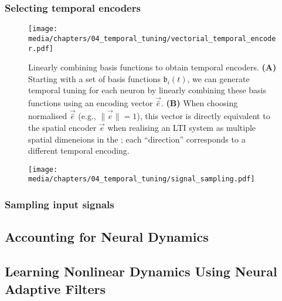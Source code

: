 \subsubsection{Selecting temporal encoders}

\begin{figure}
	\texttt{[image: media/chapters/04\_temporal\_tuning/vectorial\_temporal\_encoder.pdf]}
	\caption[Linearly combining basis functions to obtain temporal encoders]{Linearly combining basis functions to obtain temporal encoders. \textbf{(A)} Starting with a set of basis functions $\mathfrak{b}_i(t)$, we can generate temporal tuning for each neuron by linearly combining these basis functions using an encoding vector $\vec{\hat e}$.
	\textbf{(B)} When choosing normalised $\vec{\hat e}$ (e.g., $\| \vec{\hat e} \| = 1$), this vector is directly equivalent to the spatial encoder $\vec e$ when realising an LTI system as multiple spatial dimeneions in the \NEF; each \enquote{direction} corresponds to a different temporal encoding.
	}
\end{figure}

\begin{figure}[p]
	\texttt{[image: media/chapters/04\_temporal\_tuning/signal\_sampling.pdf]}
	\caption{}
\end{figure}


\subsubsection{Sampling input signals}


\begin{figure}
	
	\caption{}
\end{figure}

\subsection{Accounting for Neural Dynamics}

\subsection{Learning Nonlinear Dynamics Using Neural Adaptive Filters}
\label{sec:adaptive_filter} 

